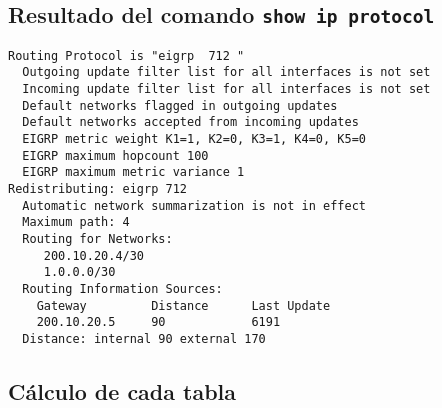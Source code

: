 \documentclass[12pt, times]{simauth}
\begin{document}
\subsection{Resultado del comando \texttt{show ip protocol}}
\begin{verbatim}
Routing Protocol is "eigrp  712 " 
  Outgoing update filter list for all interfaces is not set 
  Incoming update filter list for all interfaces is not set 
  Default networks flagged in outgoing updates  
  Default networks accepted from incoming updates 
  EIGRP metric weight K1=1, K2=0, K3=1, K4=0, K5=0
  EIGRP maximum hopcount 100
  EIGRP maximum metric variance 1
Redistributing: eigrp 712
  Automatic network summarization is not in effect  
  Maximum path: 4
  Routing for Networks:  
     200.10.20.4/30
     1.0.0.0/30
  Routing Information Sources:  
    Gateway         Distance      Last Update 
    200.10.20.5     90            6191       
  Distance: internal 90 external 170
\end{verbatim}

\newpage

\subsection{Cálculo de cada tabla}
\end{document}
